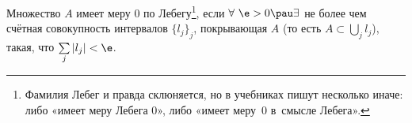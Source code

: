 
 	Множество $A$ имеет меру $0$ по Лебегу\footnote{Фамилия Лебег и правда склюняется, но в учебниках пишут несколько иначе: либо «имеет меру Лебега $0$», либо «имеет меру~$0$ в~смысле Лебега».},
 	 если $\forall\ \e>0\pau\exists$ не более чем счётная совокупность интервалов $\big\{l_j\big\}_j$, 
 	покрывающая $A$ (то есть $A\subset\bigcup\limits_{j}l_j$), такая, что $\sum\limits_j |l_j|<\e$. 	
 
